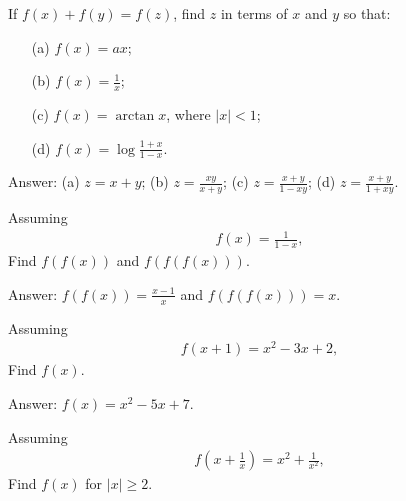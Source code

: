\documentclass[12pt,a4paper]{memoir}
\theoremstyle{definition}
\begin{document}
\begin{tcolorbox}
	\begin{question}
		If $f(x)+f(y)=f(z)$, find $z$ in terms of $x$ and $y$ so that:
		\begin{itemize}
			\item[(a)] $f(x)=ax$;
			\item[(b)] $f(x) = \frac{1}{x}$;
			\item[(c)] $f(x) = \arctan x$, where $|x|<1$;
			\item[(d)] $f(x)=\log \frac{1+x}{1-x}$.
		\end{itemize}
	\end{question}
\end{tcolorbox}

\begin{solution}[name=Solution by Parviz Shahriari]
	Answer: (a) $z=x+y$; (b) $z=\frac{xy}{x+y}$; (c) $z=\frac{x+y}{1-xy}$; (d) $z=\frac{x+y}{1+xy}$. 
\end{solution}




\begin{tcolorbox}
	\begin{question}
		Assuming
		\begin{align*}
			f(x)= \frac{1}{1-x},
		\end{align*}
		Find $f(f(x))$ and $f(f(f(x)))$.
	\end{question}
\end{tcolorbox}

\begin{solution}[name=Solution by Parviz Shahriari]
	Answer: $f(f(x))=\frac{x-1}{x}$ and $f(f(f(x)))=x$.
\end{solution}



\begin{tcolorbox}
	\begin{question}
		Assuming
		\begin{align*}
			f(x+1)= x^2-3x+2,
		\end{align*}
		Find $f(x)$.
	\end{question}
\end{tcolorbox}

\begin{solution}[name=Solution by Parviz Shahriari]
	Answer: $f(x)=x^2-5x+7$.
\end{solution}


\begin{tcolorbox}
	\begin{question}
		Assuming
		\begin{align*}
			f\left(x+\frac{1}{x}\right)= x^2 + \frac{1}{x^2},
		\end{align*}
		Find $f(x)$ for $|x| \geq 2$.
	\end{question}
\end{tcolorbox}
\end{document}
